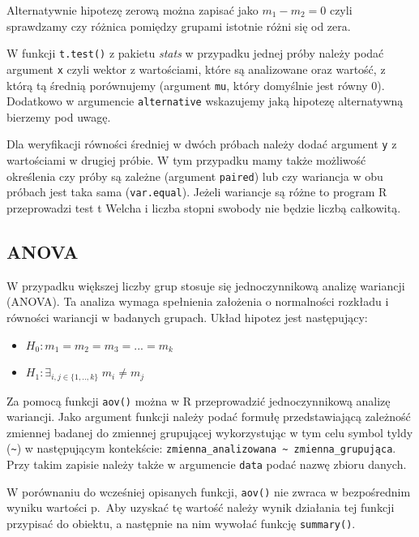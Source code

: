 \documentclass[]{book}
\providecommand{\tightlist}{%
  \setlength{\itemsep}{0pt}\setlength{\parskip}{0pt}}
\begin{document}
Alternatywnie hipotezę zerową można zapisać jako \(m_1 - m_2 = 0\) czyli sprawdzamy czy różnica pomiędzy grupami istotnie różni się od zera.

W funkcji \texttt{t.test()} z pakietu \emph{stats} w przypadku jednej próby należy podać argument \texttt{x} czyli wektor z wartościami, które są analizowane oraz wartość, z którą tą średnią porównujemy (argument \texttt{mu}, który domyślnie jest równy 0). Dodatkowo w argumencie \texttt{alternative} wskazujemy jaką hipotezę alternatywną bierzemy pod uwagę.

Dla weryfikacji równości średniej w dwóch próbach należy dodać argument \texttt{y} z wartościami w drugiej próbie. W tym przypadku mamy także możliwość określenia czy próby są zależne (argument \texttt{paired}) lub czy wariancja w obu próbach jest taka sama (\texttt{var.equal}). Jeżeli wariancje są różne to program R przeprowadzi test t Welcha i liczba stopni swobody nie będzie liczbą całkowitą.

\hypertarget{anova}{%
\subsection{ANOVA}\label{anova}}

W przypadku większej liczby grup stosuje się jednoczynnikową analizę wariancji (ANOVA). Ta analiza wymaga spełnienia założenia o normalności rozkładu i równości wariancji w badanych grupach. Układ hipotez jest następujący:

\begin{itemize}
\tightlist
\item
  \(H_0: m_1 = m_2 = m_3 = ... = m_k\)
\item
  \(H_1: \exists_{i,j\in\{1,..,k\}} \; m_i \neq m_j\)
\end{itemize}

Za pomocą funkcji \texttt{aov()} można w R przeprowadzić jednoczynnikową analizę wariancji. Jako argument funkcji należy podać formułę przedstawiającą zależność zmiennej badanej do zmiennej grupującej wykorzystując w tym celu symbol tyldy (\texttt{\textasciitilde{}}) w następującym kontekście: \texttt{zmienna\_analizowana\ \textasciitilde{}\ zmienna\_grupująca}. Przy takim zapisie należy także w argumencie \texttt{data} podać nazwę zbioru danych.

W porównaniu do wcześniej opisanych funkcji, \texttt{aov()} nie zwraca w bezpośrednim wyniku wartości p.~Aby uzyskać tę wartość należy wynik działania tej funkcji przypisać do obiektu, a następnie na nim wywołać funkcję \texttt{summary()}.
\end{document}
